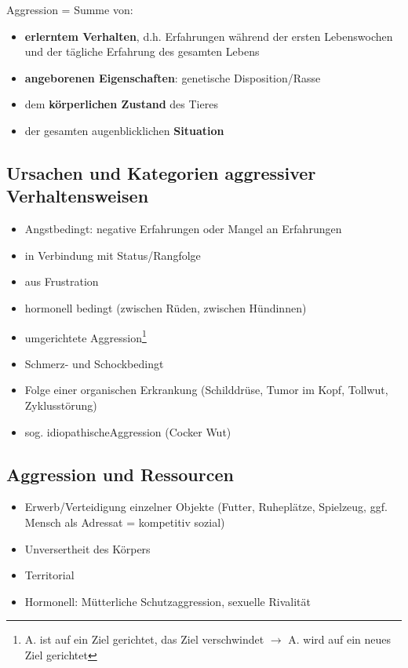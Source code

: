     \clearpage
    Aggression = Summe von:
    \begin{itemize}
        \item \textbf{erlerntem Verhalten}, d.h. Erfahrungen während der ersten Lebenswochen und der tägliche Erfahrung des gesamten Lebens
        \item \textbf{angeborenen Eigenschaften}: genetische Disposition/Rasse
        \item dem \textbf{körperlichen Zustand} des Tieres
        \item der gesamten augenblicklichen \textbf{Situation}
    \end{itemize}

    \subsection{Ursachen und Kategorien aggressiver Verhaltensweisen}
        \begin{itemize}
            \item Angstbedingt: negative Erfahrungen oder Mangel an Erfahrungen
            \item in Verbindung mit Status/Rangfolge
            \item aus Frustration
            \item hormonell bedingt (zwischen Rüden, zwischen Hündinnen)
            \item umgerichtete Aggression\footnote{A. ist auf ein Ziel gerichtet, das Ziel verschwindet $\rightarrow$ A. wird auf ein neues Ziel gerichtet}
            \item Schmerz- und Schockbedingt
            \item Folge einer organischen Erkrankung (Schilddrüse, Tumor im Kopf, Tollwut, Zyklusstörung)
            \item sog. \glqq idiopathische\grqq Aggression (\glqq Cocker Wut\grqq)
        \end{itemize}

    \subsection{Aggression und Ressourcen}
    \begin{itemize}
        \item Erwerb/Verteidigung einzelner Objekte (Futter, Ruheplätze, Spielzeug, ggf. Mensch als Adressat = kompetitiv sozial)
        \item Unversertheit des Körpers
        \item Territorial
        \item Hormonell: Mütterliche Schutzaggression, sexuelle Rivalität
    \end{itemize}

